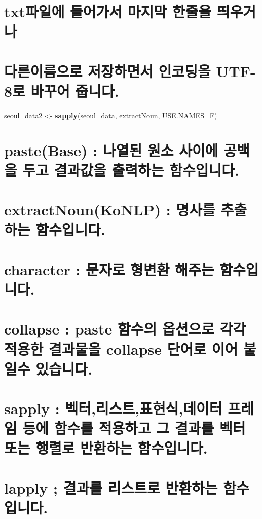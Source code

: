 \documentclass[]{article}
\newenvironment{Shaded}{\begin{snugshade}}{\end{snugshade}}
\newcommand{\KeywordTok}[1]{\textcolor[rgb]{0.13,0.29,0.53}{\textbf{#1}}}
\newcommand{\DataTypeTok}[1]{\textcolor[rgb]{0.13,0.29,0.53}{#1}}
\newcommand{\StringTok}[1]{\textcolor[rgb]{0.31,0.60,0.02}{#1}}
\newcommand{\NormalTok}[1]{#1}
\begin{document}
\section{txt파일에 들어가서 마지막 한줄을 띄우거나}\label{txt----}

\section{다른이름으로 저장하면서 인코딩을 UTF-8로 바꾸어
줍니다.}\label{---utf-8--.}

\begin{Shaded}
\begin{Highlighting}[]
\NormalTok{seoul_data2 <-}\StringTok{ }\KeywordTok{sapply}\NormalTok{(seoul_data, extractNoun, }\DataTypeTok{USE.NAMES=}\NormalTok{F)}
\end{Highlighting}
\end{Shaded}

\section{paste(Base) : 나열된 원소 사이에 공백을 두고 결과값을 출력하는
함수입니다.}\label{pastebase--------.}

\section{extractNoun(KoNLP) : 명사를 추출하는
함수입니다.}\label{extractnounkonlp---.}

\section{character : 문자로 형변환 해주는
함수입니다.}\label{character----.}

\section{collapse : paste 함수의 옵션으로 각각 적용한 결과물을 collapse
단어로 이어 붙일수 있습니다.}\label{collapse-paste------collapse----.}

\section{sapply : 벡터,리스트,표현식,데이터 프레임 등에 함수를 적용하고
그 결과를 벡터 또는 행렬로 반환하는
함수입니다.}\label{sapply------------.}

\section{lapply ; 결과를 리스트로 반환하는
함수입니다.}\label{lapply----.}
\end{document}
